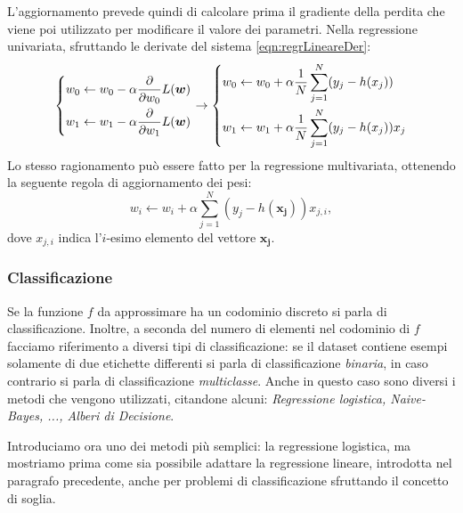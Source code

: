 \documentclass[../../main.tex]{subfiles}
\begin{document}
    L'aggiornamento prevede quindi di calcolare prima il gradiente della perdita che viene poi utilizzato per modificare il valore dei parametri. Nella regressione univariata, sfruttando le derivate del sistema \ref{eqn:regrLineareDer}:
    \[
        \begin{dcases}
            w_0 \leftarrow w_0 - \alpha \frac{\partial}{\partial w_0} L(\boldsymbol{w})\\
            w_1 \leftarrow w_1- \alpha \frac{\partial}{\partial w_1} L(\boldsymbol{w})
        \end{dcases}
        \rightarrow
        \begin{dcases}
            w_0 \leftarrow w_0 + \alpha \frac{1}{N} \sum_{j=1}^N (y_j - h(x_j))\\
            w_1 \leftarrow w_1 + \alpha \frac{1}{N} \sum_{j=1}^N (y_j - h(x_j))x_j
        \end{dcases}
    \]
    Lo stesso ragionamento può essere fatto per la regressione multivariata, ottenendo la seguente regola di aggiornamento dei pesi:
    \[w_i \leftarrow w_i + \alpha \sum_{j=1}^N(y_j - h(\boldsymbol{x_j}))x_{j,i},\]
    dove $x_{j,i}$ indica l'$i$-esimo elemento del vettore $\boldsymbol{x_j}$.

    \subsubsection{Classificazione} 
    

    Se la funzione $f$ da approssimare ha un codominio discreto si parla di classificazione. Inoltre, a seconda del numero di elementi nel codominio di $f$ facciamo riferimento a diversi tipi di classificazione: se il dataset contiene esempi solamente di due etichette differenti si parla di classificazione \textit{binaria}, in caso contrario si parla di classificazione \textit{multiclasse}. Anche in questo caso sono diversi i metodi che vengono utilizzati, citandone alcuni: \textit{Regressione logistica, Naive-Bayes, ..., Alberi di Decisione}.
    
    Introduciamo ora uno dei metodi più semplici: la regressione logistica, ma mostriamo prima come sia possibile adattare la regressione lineare, introdotta nel paragrafo precedente, anche per problemi di classificazione sfruttando il concetto di soglia.
\end{document}
